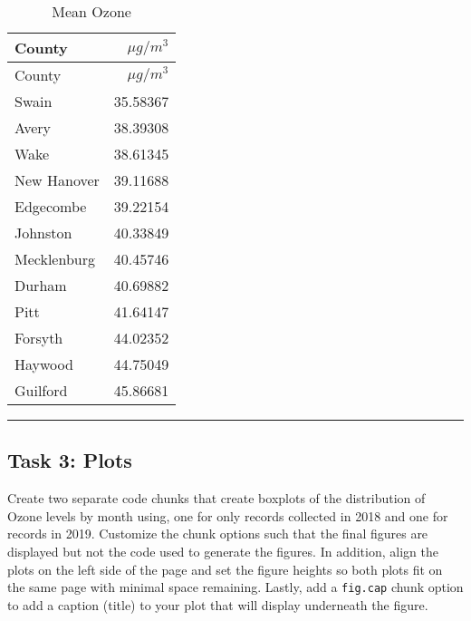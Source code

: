 \documentclass[
]{article}
\begin{document}
\begin{longtable}[]{@{}lr@{}}
\caption{Mean Ozone}\tabularnewline
\toprule\noalign{}
County & \(\mu g/m^3\) \\
\midrule\noalign{}
\endfirsthead
\toprule\noalign{}
County & \(\mu g/m^3\) \\
\midrule\noalign{}
\endhead
\bottomrule\noalign{}
\endlastfoot
Swain & 35.58367 \\
Avery & 38.39308 \\
Wake & 38.61345 \\
New Hanover & 39.11688 \\
Edgecombe & 39.22154 \\
Johnston & 40.33849 \\
Mecklenburg & 40.45746 \\
Durham & 40.69882 \\
Pitt & 41.64147 \\
Forsyth & 44.02352 \\
Haywood & 44.75049 \\
Guilford & 45.86681 \\
\end{longtable}

\begin{center}\rule{0.5\linewidth}{0.5pt}\end{center}

\hypertarget{task-3-plots}{%
\subsection{Task 3: Plots}\label{task-3-plots}}

Create two separate code chunks that create boxplots of the distribution
of Ozone levels by month using, one for only records collected in 2018
and one for records in 2019. Customize the chunk options such that the
final figures are displayed but not the code used to generate the
figures. In addition, align the plots on the left side of the page and
set the figure heights so both plots fit on the same page with minimal
space remaining. Lastly, add a \texttt{fig.cap} chunk option to add a
caption (title) to your plot that will display underneath the figure.
\end{document}

